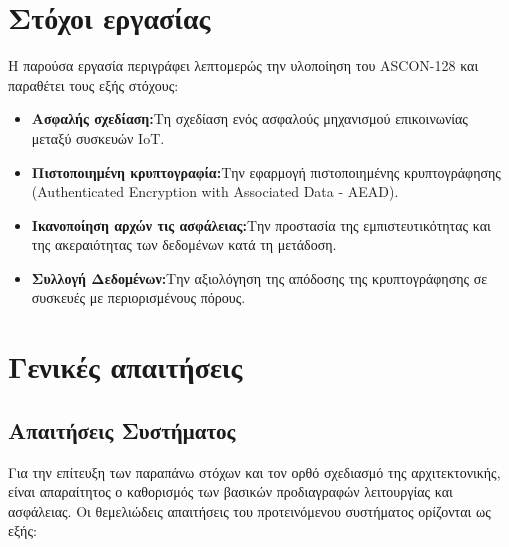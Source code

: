 \documentclass[runningheads]{llncs}
\begin{document}
\section{ Στόχοι εργασίας}
Η παρούσα εργασία περιγράφει λεπτομερώς την υλοποίηση του ASCON-128 και παραθέτει τους εξής στόχους: 

\begin{itemize}
    \item \textbf{Ασφαλής σχεδίαση:}Τη σχεδίαση ενός ασφαλούς μηχανισμού επικοινωνίας μεταξύ συσκευών IoT.
    \item \textbf{Πιστοποιημένη κρυπτογραφία:}Την εφαρμογή πιστοποιημένης κρυπτογράφησης (Authenticated Encryption with Associated Data - AEAD).
    \item \textbf{Ικανοποίηση αρχών τις ασφάλειας:}Την προστασία της εμπιστευτικότητας και της ακεραιότητας των δεδομένων κατά τη μετάδοση.
    \item \textbf{Συλλογή Δεδομένων:}Την αξιολόγηση της απόδοσης της κρυπτογράφησης σε συσκευές με περιορισμένους πόρους.
\end{itemize}

\section{Γενικές απαιτήσεις} %

    \subsection{Απαιτήσεις Συστήματος}

    Για την επίτευξη των παραπάνω στόχων και τον ορθό σχεδιασμό της αρχιτεκτονικής, είναι απαραίτητος ο καθορισμός των βασικών προδιαγραφών λειτουργίας και ασφάλειας. 
    Οι θεμελιώδεις απαιτήσεις του προτεινόμενου συστήματος ορίζονται ως εξής:
\end{document}
